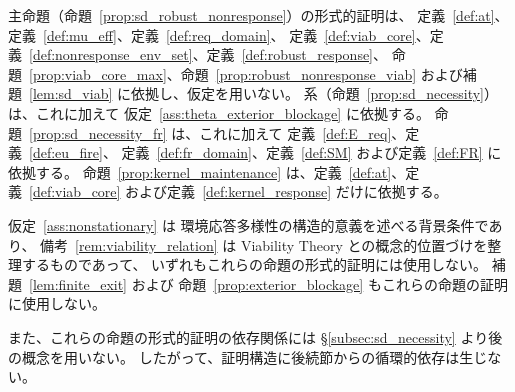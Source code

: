 \begin{remark}[循環参照の不在]
\label{rem:no_circular}
主命題（命題~\ref{prop:sd_robust_nonresponse}）の形式的証明は、
定義~\ref{def:at}、定義~\ref{def:mu_eff}、定義~\ref{def:req_domain}、
定義~\ref{def:viab_core}、定義~\ref{def:nonresponse_env_set}、定義~\ref{def:robust_response}、
命題~\ref{prop:viab_core_max}、命題~\ref{prop:robust_nonresponse_viab}
および補題~\ref{lem:sd_viab} に依拠し、仮定を用いない。
系（命題~\ref{prop:sd_necessity}）は、これに加えて
仮定~\ref{ass:theta_exterior_blockage} に依拠する。
命題~\ref{prop:sd_necessity_fr} は、これに加えて
定義~\ref{def:E_req}、定義~\ref{def:eu_fire}、
定義~\ref{def:fr_domain}、定義~\ref{def:SM} および定義~\ref{def:FR} に依拠する。
命題~\ref{prop:kernel_maintenance} は、定義~\ref{def:at}、定義~\ref{def:viab_core} および定義~\ref{def:kernel_response} だけに依拠する。

仮定~\ref{ass:nonstationary} は
環境応答多様性の構造的意義を述べる背景条件であり、
備考~\ref{rem:viability_relation} は
Viability Theory との概念的位置づけを整理するものであって、
いずれもこれらの命題の形式的証明には使用しない。
補題~\ref{lem:finite_exit} および
命題~\ref{prop:exterior_blockage} もこれらの命題の証明に使用しない。

また、これらの命題の形式的証明の依存関係には
\S\ref{subsec:sd_necessity} より後の概念を用いない。
したがって、証明構造に後続節からの循環的依存は生じない。
\end{remark}

